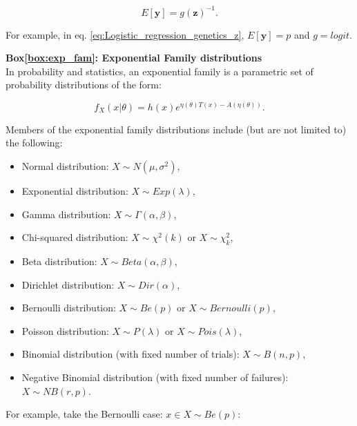 \begin{equation*}
 E[\mathbf{y}] = g(\mathbf{z})^{-1}. 
\end{equation*}

For example, in eq. \eqref{eq:Logistic_regression_genetics_z}, $E[\mathbf{y}] = p$ and $ g = logit $.



\newpage

\begin{Comment}
\hspace{-2.5mm}\textbf{Box\ref{box:exp_fam}: Exponential Family distributions}\label{box:exp_fam}\\
In probability and statistics, an exponential family \cite{andersen1970sufficiency} is a parametric set of probability distributions of the form:

\begin{equation*}
    f_X(x|\theta) = h(x)e^{\eta(\theta) T(x)-A(\eta(\theta))}.
\end{equation*}

Members of the exponential family distributions include (but are not limited to) the following:
\begin{itemize}
    \item Normal distribution: $X \sim N(\mu,\sigma^2)$,
    \item Exponential distribution: $ X \sim Exp(\lambda)$,
    \item Gamma distribution: $ X \sim \Gamma(\alpha,\beta)$,
    \item Chi-squared distribution: $ X \sim \chi^2 (k)$ or $ X \sim \chi_k^2$,
    \item Beta distribution: $ X \sim Beta(\alpha,\beta)$,
    \item Dirichlet distribution: $ X \sim Dir(\alpha)$,
    \item Bernoulli distribution: $ X \sim Be(p)$ or $ X \sim Bernoulli(p)$,
    \item Poisson distribution: $ X \sim P(\lambda)$ or $ X \sim Pois(\lambda)$,
    \item Binomial distribution (with fixed number of trials): $ X \sim B(n,p)$,
    \item Negative Binomial distribution (with fixed number of failures): $ X \sim NB(r,p)$.\\
\end{itemize}

For example, take the Bernoulli case: $x \in X \sim Be(p)$:


\end{Comment}
